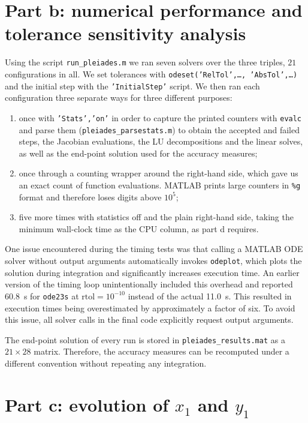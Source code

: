 \documentclass[11pt]{article}
\newcommand{\code}[1]{\texttt{#1}}
\begin{document}
\section{Part b: numerical performance and tolerance sensitivity analysis}

Using the script \code{run\_pleiades.m} we ran seven solvers over the three triples, $21$
configurations in all. We set tolerances with \code{odeset('RelTol',\dots,
'AbsTol',\dots)} and the initial step with the \code{'InitialStep'} script. We then ran each
configuration three separate ways for three different purposes:

\begin{enumerate}
\item once with \code{'Stats','on'} in order to capture the printed counters with
      \code{evalc} and parse them (\code{pleiades\_\allowbreak parsestats.m}) to obtain
      the accepted and failed steps, the Jacobian evaluations, the LU
      decompositions and the linear solves, as well as the end-point solution
      used for the accuracy measures;
\item once through a counting wrapper around the right-hand side, which gave us an
      exact count of function evaluations. MATLAB prints large counters in
      \code{\%g} format and therefore loses digits above $10^5$;
\item five more times with statistics off and the plain right-hand side, taking
      the minimum wall-clock time as the CPU column, as part d requires.
\end{enumerate}

One issue encountered during the timing tests was that calling a MATLAB
ODE solver without output arguments automatically invokes \texttt{odeplot},
which plots the solution during integration and significantly increases
execution time. An earlier version of the timing loop unintentionally
included this overhead and reported 60.8~s for \texttt{ode23s} at
$\mathrm{rtol}=10^{-10}$ instead of the actual 11.0~s. This resulted in
execution times being overestimated by approximately a factor of six.
To avoid this issue, all solver calls in the final code explicitly
request output arguments.

The end-point solution of every run is stored in \code{pleiades\_results.mat} as a
$21 \times 28$ matrix. Therefore, the accuracy measures can be recomputed under a
different convention without repeating any integration.

\section{Part c: evolution of $x_1$ and $y_1$}
\end{document}
